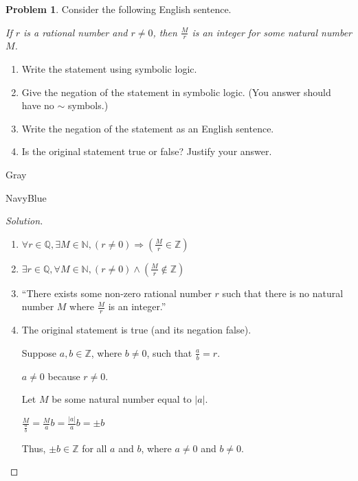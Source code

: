 \documentclass[12pt]{amsart}
\newcounter{problem_number}[section]
\theoremstyle{named}
\newenvironment{soln}
{\begin{color}{Gray}\begin{framed}\begin{color}{NavyBlue}\begin{proof}[Solution]
\doublespacing}
{\end{proof}\end{color}\end{framed}\end{color}}
\theoremstyle{definition}
\newtheorem{problem}{Problem}
\begin{document}
\vspace*{1em}

\begin{problem}
	Consider the following English sentence.
\begin{center}
	\emph{If $r$ is a rational number and $r\not=0$, then $\frac{M}{r}$ is an integer for some natural number $M$.}
\end{center}

	\begin{enumerate}
		\item Write the statement using symbolic logic.
		\item Give the negation of the statement in symbolic logic. (You answer should have no $\sim$ symbols.)
		\item Write the negation of the statement as an English sentence.
		\item Is the original statement true or false? Justify your answer.
	\end{enumerate}
\end{problem}

\begin{soln}
	\phantom{ }
	\begin{enumerate}
		\item $\forall r \in \mathbb Q,\exists M \in \mathbb N,
		(r \neq 0) \Rightarrow  (\frac{M}{r} \in \mathbb Z)$

		\item $\exists r \in \mathbb Q, \forall M \in \mathbb N, (r \neq 0)
		\land (\frac{M}{r} \notin \mathbb Z)$

		\item ``There exists some non-zero rational number $r$ such that there is no
		natural number $M$ where $\frac{M}{r}$ is an integer.''

		\item The original statement is true (and its negation false). 
		
		
		

		\noindent Suppose $a,b \in \mathbb Z$, where $b \neq 0$, such that $\frac{a}{b} = r$.

		\noindent $a \neq 0$ because $r \neq 0$.

		\noindent Let $M$ be some natural number equal to $|a|$.
		
		\noindent $\frac{M}{\frac{a}{b}} = \frac{M}{a}b = \frac{|a|}{a}b = \pm b$

		\noindent Thus, $\pm b \in \mathbb Z$ for all $a$ and $b$, where $a \neq 0$
		and $b \neq 0$. 
	\end{enumerate}
\end{soln}


\end{document}
